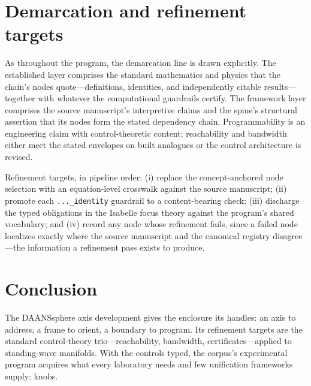 \documentclass[11pt]{article}
\theoremstyle{remark}
\begin{document}
\section{Demarcation and refinement targets}
\label{sec:demarc}

As throughout the program, the demarcation line is drawn explicitly. The established layer comprises the standard mathematics and physics that the chain's nodes quote---definitions, identities, and independently citable results---together with whatever the computational guardrails certify. The framework layer comprises the source manuscript's interpretive claims and the spine's structural assertion that its nodes form the stated dependency chain. Programmability is an engineering claim with control-theoretic content; reachability and bandwidth either meet the stated envelopes on built analogues or the control architecture is revised.

Refinement targets, in pipeline order: (i) replace the concept-anchored node selection with an equation-level crosswalk against the source manuscript; (ii) promote each \texttt{...\_identity} guardrail to a content-bearing check; (iii) discharge the typed obligations in the Isabelle focus theory against the program's shared vocabulary; and (iv) record any node whose refinement fails, since a failed node localizes exactly where the source manuscript and the canonical registry disagree---the information a refinement pass exists to produce.

\section{Conclusion}
\label{sec:conc}

The DAANSsphere axis development gives the enclosure its handles: an axis to address, a frame to orient, a boundary to program. Its refinement targets are the standard control-theory trio---reachability, bandwidth, certificates---applied to standing-wave manifolds. With the controls typed, the corpus's experimental program acquires what every laboratory needs and few unification frameworks supply: knobs.
\end{document}
